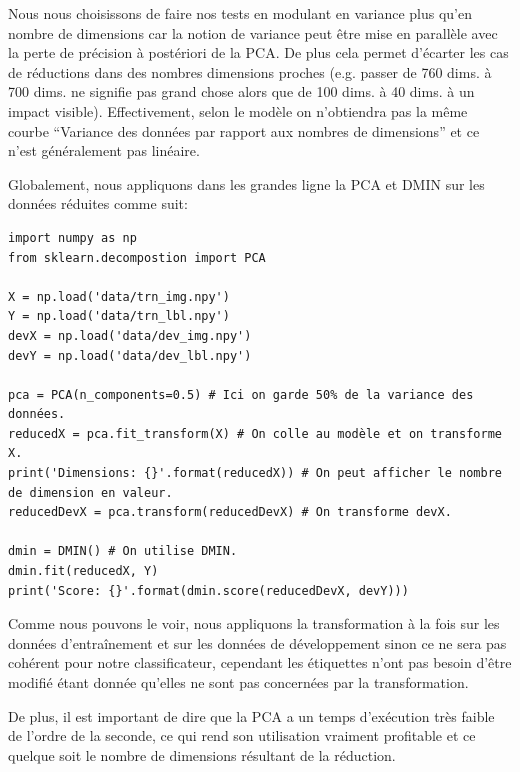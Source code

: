 \documentclass[12pt,a4paper]{article}
\begin{document}
{Nous nous choisissons de faire nos tests en modulant en variance plus qu'en nombre de dimensions car la notion de variance peut être mise en parallèle avec la perte de précision à postériori de la PCA.
De plus cela permet d'écarter les cas de réductions dans des nombres dimensions proches (e.g. passer de 760 dims. à 700 dims. ne signifie pas grand chose alors que de 100 dims. à 40 dims. à un impact visible). Effectivement, selon le modèle on n'obtiendra pas la même courbe ``Variance des données par rapport aux nombres de dimensions'' et ce n'est généralement pas linéaire.

Globalement, nous appliquons dans les grandes ligne la PCA et DMIN sur les données réduites comme suit:
\begin{lstlisting}[style=darkula]
import numpy as np
from sklearn.decompostion import PCA

X = np.load('data/trn_img.npy')
Y = np.load('data/trn_lbl.npy')
devX = np.load('data/dev_img.npy')
devY = np.load('data/dev_lbl.npy')

pca = PCA(n_components=0.5) # Ici on garde 50% de la variance des données.
reducedX = pca.fit_transform(X) # On colle au modèle et on transforme X.
print('Dimensions: {}'.format(reducedX)) # On peut afficher le nombre de dimension en valeur.
reducedDevX = pca.transform(reducedDevX) # On transforme devX.

dmin = DMIN() # On utilise DMIN.
dmin.fit(reducedX, Y)
print('Score: {}'.format(dmin.score(reducedDevX, devY)))

\end{lstlisting}

Comme nous pouvons le voir, nous appliquons la transformation à la fois sur les données d'entraînement et sur les données de développement sinon ce ne sera pas cohérent pour notre classificateur, cependant les étiquettes n'ont pas besoin d'être modifié étant donnée qu'elles ne sont pas concernées par la transformation.

De plus, il est important de dire que la PCA a un temps d'exécution très faible de l'ordre de la seconde, ce qui rend son utilisation vraiment profitable et ce quelque soit le nombre de dimensions résultant de la réduction.

}
\end{document}
